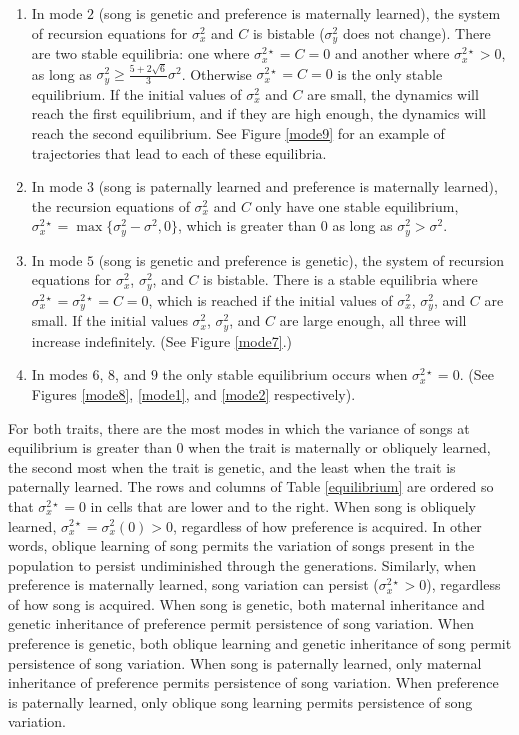 \documentclass{article}
\begin{document}
\begin{enumerate}
\item
In mode $2$ (song is genetic and preference is maternally learned), the system of recursion equations for $\sigma_x^2$ and $C$ is bistable ($\sigma_y^2$ does not change). There are two stable equilibria: one where $\sigma_x^{2\star}=C=0$ and another where $\sigma_x^{2\star}>0$, as long as $\sigma_y^2\geq\frac{5+2\sqrt{6}}{3}\sigma^2$. Otherwise $\sigma_x^{2\star}=C=0$ is the only stable equilibrium. If the initial values of $\sigma_x^2$ and $C$ are small, the dynamics will reach the first equilibrium, and if they are high enough, the dynamics will reach the second equilibrium. See Figure \ref{mode9} for an example of trajectories that lead to each of these equilibria. 
\item In mode $3$ (song is paternally learned and preference is maternally learned), the recursion equations of $\sigma_x^2$ and $C$ only have one stable equilibrium, $\sigma_x^{2\star}=\max\{\sigma_y^2-\sigma^2,0\}$, which is greater than $0$ as long as $\sigma_y^2>\sigma^2$.
\item In mode $5$ (song is genetic and preference is genetic), the system of recursion equations for $\sigma_x^2$, $\sigma_y^2$, and $C$ is bistable. There is a stable equilibria where $\sigma_x^{2\star}=\sigma_y^{2\star}=C=0$, which is reached if the initial values of $\sigma_x^2$, $\sigma_y^2$, and $C$ are small. If the initial values $\sigma_x^2$, $\sigma_y^2$, and $C$ are large enough, all three will increase indefinitely. (See Figure \ref{mode7}.)
\item In modes $6$, $8$, and $9$ the only stable equilibrium occurs when $\sigma_x^{2\star}=0$. (See Figures \ref{mode8}, \ref{mode1}, and \ref{mode2} respectively). 
\end{enumerate}

For both traits, there are the most modes in which the variance of songs at equilibrium is greater than $0$ when the trait is maternally or obliquely learned, the second most when the trait is genetic, and the least when the trait is paternally learned. The rows and columns of Table \ref{equilibrium} are ordered so that $\sigma_x^{2\star}=0$ in cells that are lower and to the right. When song is obliquely learned, $\sigma_x^{2\star}=\sigma_x^2(0)>0$, regardless of how preference is acquired. In other words, oblique learning of song permits the variation of songs present in the population to persist undiminished through the generations. Similarly, when preference is maternally learned, song variation can persist ($\sigma_x^{2\star}>0$), regardless of how song is acquired.  When song is genetic, both maternal inheritance and genetic inheritance of preference permit persistence of song variation. When preference is genetic, both oblique learning and genetic inheritance of song permit persistence of song variation.  When song is paternally learned, only maternal inheritance of preference permits persistence of song variation. When preference is paternally learned, only oblique song learning permits persistence of song variation.  
\end{document}
